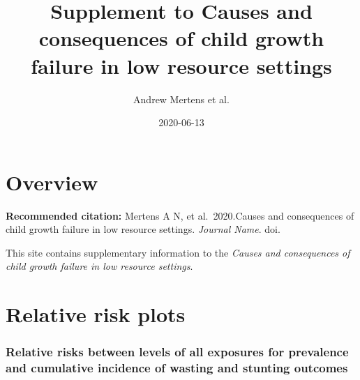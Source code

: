 \documentclass[
  9pt,
]{book}
\title{Supplement to Causes and consequences of child growth failure in low resource settings}
\author{Andrew Mertens et al.}
\date{2020-06-13}
\begin{document}
\maketitle

{
\setcounter{tocdepth}{1}
\tableofcontents
}
\hypertarget{overview}{%
\chapter{Overview}\label{overview}}

\textbf{Recommended citation:} Mertens A N, et al.~2020.Causes and consequences of child growth failure in low resource settings. \emph{Journal Name}. doi.

This site contains supplementary information to the \emph{Causes and consequences of child growth failure in low resource settings}.

\hypertarget{RR}{%
\chapter{Relative risk plots}\label{RR}}

\raggedright

\hypertarget{relative-risks-between-levels-of-all-exposures-for-prevalence-and-cumulative-incidence-of-wasting-and-stunting-outcomes}{%
\subsection{Relative risks between levels of all exposures for prevalence and cumulative incidence of wasting and stunting outcomes}\label{relative-risks-between-levels-of-all-exposures-for-prevalence-and-cumulative-incidence-of-wasting-and-stunting-outcomes}}
\end{document}
